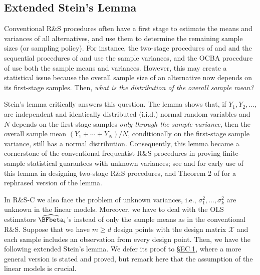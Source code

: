 \documentclass[ijoc,nonblindrev]{informs3}
\def\cX{{\mathcal X}}
\begin{document}
\subsection{Extended Stein's Lemma}

Conventional R\&S procedures often have a first stage to estimate the means and variances of all alternatives, and use them to determine the remaining sample sizes (or sampling policy).
For instance, the two-stage procedures of \cite{dudewicz1975} and \cite{rinott1978} and the sequential procedures of \cite{kim2001} and \cite{hong2006} use the sample variances,
and the OCBA procedure of \cite{ChenChenDaiYucesan97} use both the sample means and variances.
However, this may create a statistical issue because the overall sample size of an alternative now depends on its first-stage samples.
Then, \textit{what is the distribution of the overall sample mean?}

Stein's lemma \citep{stein1945} critically answers this question.
The lemma shows that, if $Y_1,Y_2,\ldots$, are independent and identically distributed (i.i.d.) normal random variables and $N$ depends on the first-stage samples \textit{only through the sample variance},
then the overall sample mean $(Y_1+\cdots+Y_N)/N$, conditionally on the first-stage sample variance, still has a normal distribution.
Consequently, this lemma became a cornerstone of the conventional frequentist R\&S procedures in proving finite-sample statistical guarantees with unknown variances;
see \cite{dudewicz1975} and \cite{rinott1978} for early use of this lemma in designing two-stage R\&S procedures, and Theorem 2 of \cite{kim2006} for a rephrased version of the lemma.

In R\&S-C we also face the problem of unknown variances, i.e., $\sigma_1^2,\ldots,\sigma_k^2$ are unknown in the linear models.
Moreover, we have to deal with the OLS estimators $\widehat\BFbeta_i$'s instead of only the sample means as in the conventional R\&S.
Suppose that we have $m\ge d$ design points with the design matrix $\cX$ and each sample includes an observation from every design point.
Then, we have the following extended Stein's lemma.
We defer its proof to \S\hyperlink{EC.1}{EC.1}, where a more general version is stated and proved,
but remark here that the assumption of the linear models is crucial.
\end{document}
